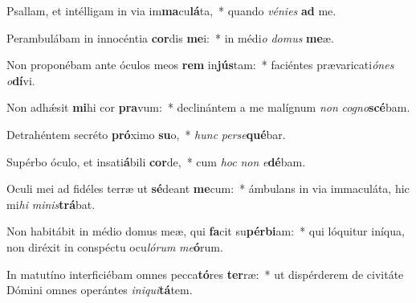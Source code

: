 \item Psallam, et intélligam in via im\textbf{ma}cu\textbf{lá}ta,~* quando \textit{vé}\textit{ni}\textit{es} \textbf{ad} me.
\item Perambulábam in innocéntia \textbf{cor}dis \textbf{me}i:~* in médi\textit{o} \textit{do}\textit{mus} \textbf{me}æ.
\item Non proponébam ante óculos meos \textbf{rem} in\textbf{jús}tam:~* faciéntes prævaricati\textit{ó}\textit{nes} \textit{o}\textbf{dí}vi.
\item Non adhǽsit \textbf{mi}hi cor \textbf{pra}vum:~* declinántem a me malígnum \textit{non} \textit{co}\textit{gno}\textbf{scé}bam.
\item Detrahéntem secréto \textbf{pró}ximo \textbf{su}o,~* \textit{hunc} \textit{per}\textit{se}\textbf{qué}bar.
\item Supérbo óculo, et insati\textbf{á}bili \textbf{cor}de,~* cum \textit{hoc} \textit{non} \textit{e}\textbf{dé}bam.
\item Oculi mei ad fidéles terræ ut \textbf{sé}deant \textbf{me}cum:~* ámbulans in via immaculáta, hic mi\textit{hi} \textit{mi}\textit{nis}\textbf{trá}bat.
\item Non habitábit in médio domus meæ, qui \textbf{fa}cit su\textbf{pér}\textbf{bi}am:~* qui lóquitur iníqua, non diréxit in conspéctu ocu\textit{ló}\textit{rum} \textit{me}\textbf{ó}rum.
\item In matutíno interficiébam omnes pecca\textbf{tó}res \textbf{ter}ræ:~* ut dispérderem de civitáte Dómini omnes operántes \textit{in}\textit{i}\textit{qui}\textbf{tá}tem.
